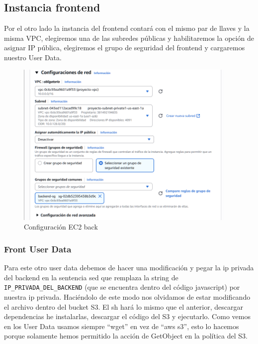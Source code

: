 \documentclass{article}
\begin{document}
	\subsection{Instancia frontend}

	Por el otro lado la instancia del frontend contará con el mismo par de llaves y la misma VPC, elegiremos una de las subredes públicas y habilitaremos la opción de asignar IP pública, elegiremos el grupo de seguridad del frontend y cargaremos nuestro User Data. 

		
	\begin{figure}[H]
	\centering
	\includegraphics[width=0.95\textwidth]{configuracion_ec2_back.png}
	\caption{Configuración EC2 back}
	\end{figure}

	
	
	\newpage
	\subsubsection{Front User Data}

	Para este otro user data debemos de hacer una modificación y pegar la ip privada del backend en la sentencia sed que remplaza la string de \verb|IP_PRIVADA_DEL_BACKEND| (que se encuentra dentro del código javascript) por nuestra ip privada. Haciéndolo de este modo nos olvidamos de estar modificando el archivo dentro del bucket S3. El sh hará lo mismo que el anterior, descargar dependencias he instalarlas, descargar el código del S3 y ejecutarlo. Como vemos en los User Data usamos siempre ``wget'' en vez de ``aws s3'', esto lo hacemos porque solamente hemos permitido la acción de GetObject en la política del S3.
	
\end{document}
